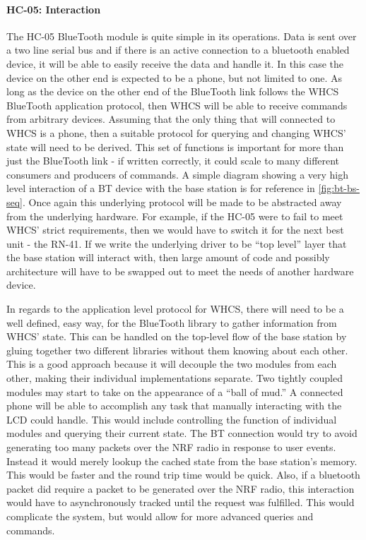\paragraph{HC-05: Interaction}
The HC-05 BlueTooth module is quite simple in its operations. Data is sent over
a two line serial bus and if there is an active connection to a bluetooth
enabled device, it will be able to easily receive the data and handle it. In
this case the device on the other end is expected to be a phone, but not
limited to one. As long as the device on the other end of the BlueTooth link
follows the WHCS BlueTooth application protocol, then WHCS will be able to
receive commands from arbitrary devices. Assuming that the only thing that will
connected to WHCS is a phone, then a suitable protocol for querying and
changing WHCS' state will need to be derived. This set of functions is
important for more than just the BlueTooth link - if written correctly, it
could scale to many different consumers and producers of commands. A simple
diagram showing a very high level interaction of a BT device with the base
station is for reference in \autoref{fig:bt-bs-seq}. Once again
this underlying protocol will be made to be abstracted away from the underlying
hardware. For example, if the HC-05 were to fail to meet WHCS' strict
requirements, then we would have to switch it for the next best unit - the
RN-41. If we write the underlying driver to be ``top level'' layer that the
base station will interact with, then large amount of code and possibly
architecture will have to be swapped out to meet the needs of another hardware
device.


In regards to the application level protocol for WHCS, there will need to be a
well defined, easy way, for the BlueTooth library to gather information from
WHCS' state. This can be handled on the top-level flow of the base station by
gluing together two different libraries without them knowing about each other.
This is a good approach because it will decouple the two modules from each
other, making their individual implementations separate. Two tightly coupled
modules may start to take on the appearance of a ``ball of mud.'' A connected
phone will be able to accomplish any task that manually interacting with the
LCD could handle. This would include controlling the function of individual
modules and querying their current state. The BT connection would try to avoid
generating too many packets over the NRF radio in response to user events.
Instead it would merely lookup the cached state from the base station's memory.
This would be faster and the round trip time would be quick. Also, if a
bluetooth packet did require a packet to be generated over the NRF radio, this
interaction would have to asynchronously tracked until the request was
fulfilled. This would complicate the system, but would allow for more advanced
queries and commands.

